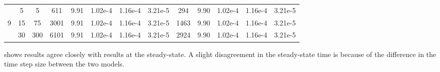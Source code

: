 \begin{table}[ht]
\begin{tabular}{|c|c|c|c|c|c|c|c|c|c|c|c|c|}
    \hline
      & 5  & 5   & 611  & 9.91 & 1.02e-4 & 1.16e-4 & 3.21e-5 & 294  & 9.90 & 1.02e-4 & 1.16e-4 & 3.21e-5 \\
    9 & 15 & 75  & 3001 & 9.91 & 1.02e-4 & 1.16e-4 & 3.21e-5 & 1463 & 9.90 & 1.02e-4 & 1.16e-4 & 3.21e-5 \\
      & 30 & 300 & 6101 & 9.91 & 1.02e-4 & 1.16e-4 & 3.21e-5 & 2924 & 9.90 & 1.02e-4 & 1.16e-4 & 3.21e-5 \\
    \hline
\end{tabular}
\label{tab:DumuxVsMatlab}
\end{table}

 shows \MATLAB results agree closely with \DuMuX results at the steady-state. A slight disagreement in the steady-state time is 
because of the difference in the time step size between the two models. \\

